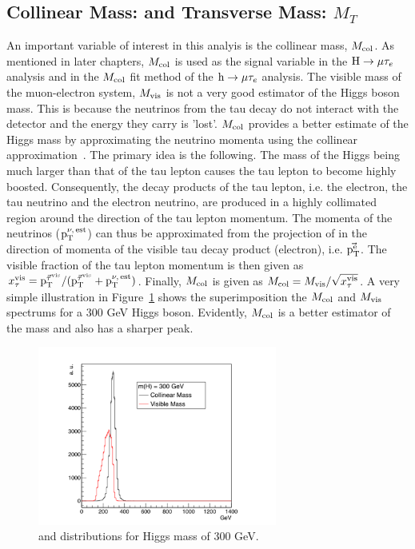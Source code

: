 \subsection{Collinear Mass: \mcol and Transverse Mass: $M_{T}$}
An important variable of interest in this analyis is the collinear mass, $M_{\text{col}}$. As mentioned in later chapters, $M_{\text{col}}$ is used as the signal variable in the $\text{H} \to \mu \tau_{e}$ analysis and in the $M_{\text{col}}$ fit method of the $\text{h} \to \mu \tau_{e}$ analysis. The visible mass of the muon-electron system, $M_{\text{vis}}$ is not a very good estimator of the Higgs boson mass. This is because the neutrinos from the tau decay do not interact with the detector and the energy they carry is 'lost'. $M_{\text{col}}$ provides a better estimate of the Higgs mass by approximating the neutrino momenta using the collinear approximation~\cite{Ellis:1987xu}. The primary idea is the following. The mass of the Higgs being much larger than that of the tau lepton causes the tau lepton to become highly boosted. Consequently, the decay products of the tau lepton, i.e. the electron, the tau neutrino and the electron neutrino, are produced in a highly collimated region around the direction of the tau lepton momentum. The momenta of the neutrinos ($\text{p}_\text{T}^{\nu,\,\text{est}}$) can thus be approximated from the projection of \ptvecmiss in the direction of momenta of the visible tau decay product (electron), i.e. $\vec{\text{p}_\text{T}^{\text{e}}}$. The visible fraction of the tau lepton momentum is then given as $x_{\tau}^\text{vis}={\text{p}_\text{T}^{\vec{\tau}^{\text{vis}}}}/{(\text{p}_\text{T}^{\vec{\tau}^\text{vis}}+\text{p}_\text{T}^{\nu,\,\text{est}})}$. Finally, $M_{\text{col}}$ is given as $M_{\text{col}}= M_{\text{vis}} / \sqrt{\smash[b]{x_{\tau}^\text{vis}}}$. A very simple illustration in Figure~\ref{fig:mcol_v_mvis} shows the superimposition  the $M_{\text{col}}$ and $M_{\text{vis}}$ spectrums for a 300 GeV Higgs boson. Evidently, $M_{\text{col}}$ is a better estimator of the mass and also has a sharper peak.

\begin{figure}[!htpb]\centering
 \includegraphics[width=0.7\textwidth]{plots_and_figures/chapter4/mcol_v_mvis.pdf}
\caption{\mcol and \mvis distributions for Higgs mass of 300 GeV.}
 \label{fig:mcol_v_mvis}
\end{figure}


